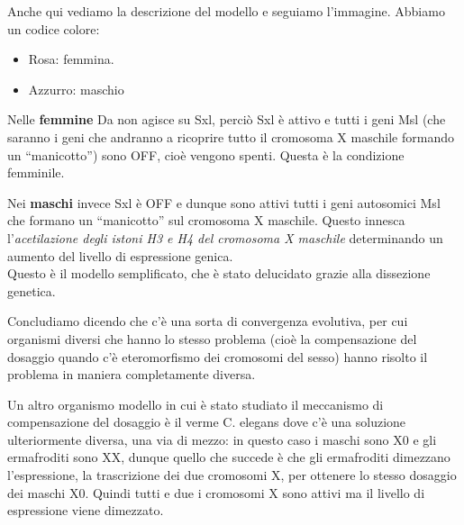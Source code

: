 \documentclass[11pt]{book}
\begin{document}
Anche qui vediamo la descrizione del modello e seguiamo l’immagine.
Abbiamo un codice colore:
\begin{itemize}
\item Rosa: femmina.
\item Azzurro: maschio
\end{itemize}
 
Nelle \textbf{femmine} Da non agisce su Sxl, perciò Sxl è attivo e tutti i geni Msl (che saranno i geni che andranno a ricoprire tutto il cromosoma X maschile formando un ``manicotto'') sono OFF, cioè vengono spenti. Questa è la condizione femminile.

Nei \textbf{maschi} invece Sxl è OFF e dunque sono attivi tutti i geni autosomici Msl che formano un ``manicotto'' sul cromosoma X maschile. Questo innesca l’\emph{acetilazione degli istoni H3 e H4 del cromosoma X maschile} determinando un aumento del livello di espressione genica.\\
Questo è il modello semplificato, che è stato delucidato grazie alla dissezione genetica. 

Concludiamo dicendo che c’è una sorta di convergenza evolutiva, per cui organismi diversi che hanno lo stesso problema (cioè la compensazione del dosaggio quando c’è eteromorfismo dei cromosomi del sesso) hanno risolto il problema in maniera completamente diversa.

Un altro organismo modello in cui è stato studiato il meccanismo di compensazione del dosaggio è il verme C. elegans dove c’è una soluzione ulteriormente diversa, una via di mezzo: in questo caso  i maschi sono X0 e gli ermafroditi sono XX, dunque quello che succede è che gli ermafroditi dimezzano l’espressione, la trascrizione dei due cromosomi X, per ottenere lo stesso dosaggio dei maschi X0. Quindi tutti e due i cromosomi X sono attivi ma il livello di espressione viene dimezzato.


 
\end{document}

